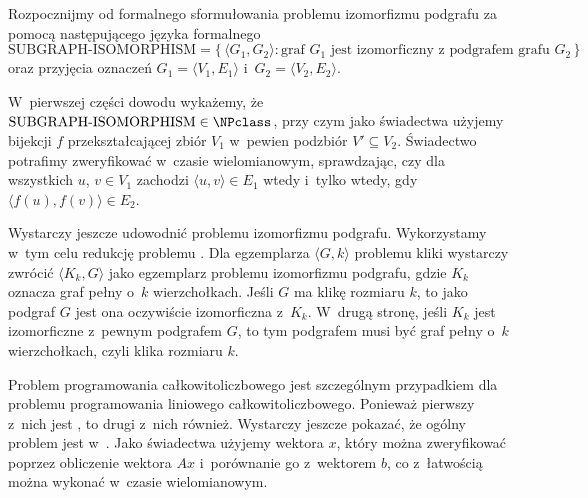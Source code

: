 
\exercise %
Rozpocznijmy od formalnego sformułowania problemu izomorfizmu podgrafu za pomocą następującego języka formalnego 
\[
	\text{SUBGRAPH-ISOMORPHISM} = \bigl\{\,\langle G_1,G_2\rangle:\text{graf $G_1$ jest izomorficzny z~podgrafem grafu $G_2$}\,\bigr\}
\]
oraz przyjęcia oznaczeń $G_1=\langle V_1,E_1\rangle$ i~$G_2=\langle V_2,E_2\rangle$.

W~pierwszej części dowodu wykażemy, że $\text{SUBGRAPH-ISOMORPHISM}\in\NPclass$, przy czym jako świadectwa użyjemy bijekcji $f$ przekształcającej zbiór $V_1$ w~pewien podzbiór $V'\subseteq V_2$.
Świadectwo potrafimy zweryfikować w~czasie wielomianowym, sprawdzając, czy dla wszystkich $u$, $v\in V_1$ zachodzi $\langle u,v\rangle\in E_1$ wtedy i~tylko wtedy, gdy $\langle f(u),f(v)\rangle\in E_2$.

Wystarczy jeszcze udowodnić  problemu izomorfizmu podgrafu.
Wykorzystamy w~tym celu redukcję problemu .
Dla egzemplarza $\langle G,k\rangle$ problemu kliki wystarczy zwrócić $\langle K_k,G\rangle$ jako egzemplarz problemu izomorfizmu podgrafu, gdzie $K_k$ oznacza graf pełny o~$k$ wierzchołkach.
Jeśli $G$ ma klikę rozmiaru $k$, to jako podgraf $G$ jest ona oczywiście izomorficzna z~$K_k$.
W~drugą stronę, jeśli $K_k$ jest izomorficzne z~pewnym podgrafem $G$, to tym podgrafem musi być graf pełny o~$k$ wierzchołkach, czyli klika rozmiaru $k$.

\exercise %
\exercise %
Problem  programowania całkowitoliczbowego jest szczególnym przypadkiem dla problemu programowania liniowego całkowitoliczbowego.
Ponieważ pierwszy z~nich jest , to drugi z~nich również.
Wystarczy jeszcze pokazać, że ogólny problem jest w~\NPclass.
Jako świadectwa użyjemy wektora $x$, który można zweryfikować poprzez obliczenie wektora $Ax$ i~porównanie go z~wektorem $b$, co z~łatwością można wykonać w~czasie wielomianowym.

\exercise %
\exercise %
\exercise %
\exercise %
\exercise %
